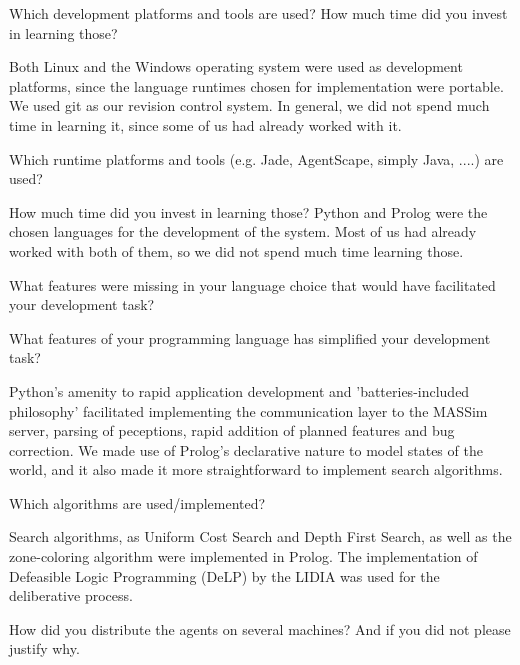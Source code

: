 \begin{question}
Which development platforms and tools are used? How much time did you
invest in learning those?  
\end{question}

Both Linux and the Windows operating system were
used as development platforms, since the language runtimes chosen for
implementation were portable.  We used git as our revision control system. In
general, we did not spend much time in learning it, since some of us had
already worked with it.

\begin{question}
Which runtime platforms and tools (e.g. Jade, AgentScape, simply Java,
....) are used? 
\end{question}

How much time did you invest in learning those?  Python and
Prolog were the chosen languages for the development of the system. Most of us
had already worked with both of them, so we did not spend much time learning
those.

\begin{question}
What features were missing in your language choice that would have
facilitated your development task?
\end{question}

\begin{question}
What features of your programming language has simplified your development
task?  
\end{question}

Python's amenity to rapid application development and
'batteries-included philosophy' facilitated implementing the communication
layer to the MASSim server, parsing of peceptions, rapid addition of planned
features and bug correction.  We made use of Prolog's declarative nature to
model states of the world, and it also made it more straightforward to
implement search algorithms.

\begin{question}
Which algorithms are used/implemented?  
\end{question}

Search algorithms, as Uniform Cost
Search and Depth First Search, as well as the zone-coloring algorithm were
implemented in Prolog.  The implementation of Defeasible Logic Programming
(DeLP) by the LIDIA was used for the deliberative process.

\begin{question}
How did you distribute the agents on several machines? And if you did not
please justify why.  
\end{question}

